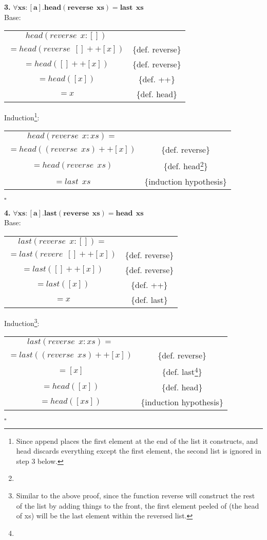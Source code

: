\documentclass[12pt]{article}
\begin{document}
\clearpage

\textbf{3.} $\pmb{\forall xs:[a]. head(reverse~~xs) = last~~xs}$ \\
Base:
\begin{center}
\begin{tabular}{cc}
$head(reverse~~x:[])$ & {} \\
$= head(reverse~~[] ++ [x])$ & \{def. reverse\} \\
$= head([] ++ [x])$ & \{def. reverse\} \\
$= head([x])$ & \{def. ++\} \\
$= x$ & \{def. head\} \\
\end{tabular}
\end{center}

Induction\footnote{Since append places the first element at the end of the list it constructs, and head discards everything except the first element, the second list is ignored in step 3 below.}:
\begin{center}
\begin{tabular}{cc}
$head(reverse~~x:xs) = $ & {} \\
$= head((reverse~~xs) ++ [x])$ & \{def. reverse\} \\
$= head(reverse~~xs)$ & \{def. head\footnote[1]{}\} \\
$= last~~xs$ & \{induction hypothesis\} \\
\end{tabular}
\end{center}
$\square$

\textbf{4.} $\pmb{\forall xs:[a]. last(reverse~~xs) = head~~xs}$ \\
Base:
\begin{center}
\begin{tabular}{cc}
$last(reverse~~x:[]) = $ & {} \\
$= last(revere~~[] ++ [x])$ & \{def. reverse\} \\
$= last([] ++ [x])$ & \{def. reverse\} \\
$= last([x])$ & \{def. ++\} \\
$= x$ & \{def. last\} \\
\end{tabular}
\end{center}

Induction\footnote{Similar to the above proof, since the function reverse will construct the rest of the list by adding things to the front, the first element peeled of (the head of xs) will be the last element within the reversed list.}:
\begin{center}
\begin{tabular}{cc}
$last(reverse~~x:xs) = $ & {} \\
$= last((reverse~~xs) ++ [x])$ & \{def. reverse\} \\
$= [x]$ & \{def. last\footnote[2]{}\} \\
$= head([x])$ & \{def. head\} \\
$= head([xs])$ & \{induction hypothesis\}
\end{tabular}
\end{center}
$\square$
\end{document}

